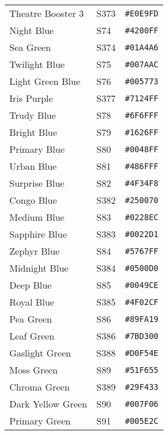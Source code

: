\documentclass[a4paper]{article}
\begin{document}
\begin{longtable}{|l|l|r|}
Theatre Booster 3 & S373 & \texttt{\#E0E9FD} \cellcolor[HTML]{E0E9FD} \\
Night Blue & S74 & \texttt{\#4200FF} \cellcolor[HTML]{4200FF} \\
Sea Green & S374 & \texttt{\#01A4A6} \cellcolor[HTML]{01A4A6} \\
Twilight Blue & S75 & \texttt{\#007AAC} \cellcolor[HTML]{007AAC} \\
Light Green Blue & S76 & \texttt{\#005773} \cellcolor[HTML]{005773} \\
Iris Purple & S377 & \texttt{\#7124FF} \cellcolor[HTML]{7124FF} \\
Trudy Blue & S78 & \texttt{\#6F6FFF} \cellcolor[HTML]{6F6FFF} \\
Bright Blue & S79 & \texttt{\#1626FF} \cellcolor[HTML]{1626FF} \\
Primary Blue & S80 & \texttt{\#0048FF} \cellcolor[HTML]{0048FF} \\
Urban Blue & S81 & \texttt{\#486FFF} \cellcolor[HTML]{486FFF} \\
Surprise Blue & S82 & \texttt{\#4F34F8} \cellcolor[HTML]{4F34F8} \\
Congo Blue & S382 & \texttt{\#250070} \cellcolor[HTML]{250070} \\
Medium Blue & S83 & \texttt{\#0228EC} \cellcolor[HTML]{0228EC} \\
Sapphire Blue & S383 & \texttt{\#0022D1} \cellcolor[HTML]{0022D1} \\
Zephyr Blue & S84 & \texttt{\#5767FF} \cellcolor[HTML]{5767FF} \\
Midnight Blue & S384 & \texttt{\#0500D0} \cellcolor[HTML]{0500D0} \\
Deep Blue & S85 & \texttt{\#0049CE} \cellcolor[HTML]{0049CE} \\
Royal Blue & S385 & \texttt{\#4F02CF} \cellcolor[HTML]{4F02CF} \\
Pea Green & S86 & \texttt{\#89FA19} \cellcolor[HTML]{89FA19} \\
Leaf Green & S386 & \texttt{\#7BD300} \cellcolor[HTML]{7BD300} \\
Gaslight Green & S388 & \texttt{\#D0F54E} \cellcolor[HTML]{D0F54E} \\
Moss Green & S89 & \texttt{\#51F655} \cellcolor[HTML]{51F655} \\
Chroma Green & S389 & \texttt{\#29F433} \cellcolor[HTML]{29F433} \\
Dark Yellow Green & S90 & \texttt{\#007F06} \cellcolor[HTML]{007F06} \\
Primary Green & S91 & \texttt{\#005E2C} \cellcolor[HTML]{005E2C} \\

\end{longtable}
\end{document}
